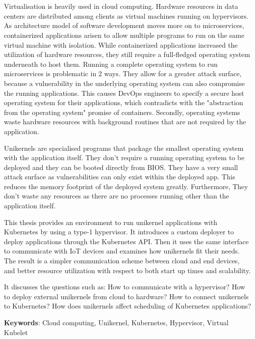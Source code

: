 \chapter{\abstractname}

Virtualisation is heavily used in cloud computing. Hardware resources in data centers are distributed among clients as virtual machines running on hypervisors. As architecture model of software development moves more on to microservices, containerized applications arisen to allow multiple programs to run on the same virtual machine with isolation. While containerized applications increased the utilization of hardware resources, they still require a full-fledged operating system underneath to host them.
Running a complete operating system to run microservices is problematic in 2 ways. They allow for a greater attack surface, because a vulnerability in the underlying operating system can also compromise the running applications. This causes DevOps engineers to specify a secure host operating system for their applications, which contradicts with the "abstraction from the operating system" promise of containers. Secondly, operating systems waste hardware resources with background routines that are not required by the application.

Unikernels are specialised programs that package the smallest operating system with the application itself. They don't require a running operating system to be deployed and they can be booted directly from BIOS. They have a very small attack surface as vulnerabilities can only exist within the deployed app. This reduces the memory footprint of the deployed system greatly. Furthermore, They don't waste any resources as there are no processes running other than the application itself.

This thesis provides an environment to run unikernel applications with Kubernetes by using a type-1 hypervisor. It introduces a custom deployer to deploy applications through the Kubernetes API. Then it uses the same interface to communicate with IoT devices and examines how unikernels fit their needs. The result is a simpler communication scheme between cloud and end devices, and better resource utilization with respect to both start up times and scalability.

It discusses the questions such as: How to communicate with a hypervisor? How to deploy external unikernels from cloud to hardware? How to connect unikernels to Kubernetes? How does unikernels affect scheduling of Kubernetes applications?

\textbf{Keywords}: Cloud computing, Unikernel, Kubernetes, Hypervisor, Virtual Kubelet
